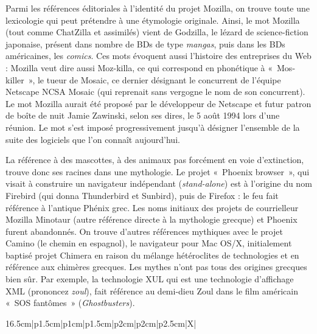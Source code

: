 \documentclass{FramateX}
\begin{document}
\begin{refsection}
Parmi les références éditoriales à l'identité du projet Mozilla, on
trouve toute une lexicologie qui peut prétendre à une étymologie
originale. Ainsi, le mot Mozilla (tout comme ChatZilla et assimilés)
vient de Godzilla, le lézard de science-fiction japonaise, présent dans
nombre de BDs de type \textit{mangas}, puis dans les BDs américaines, les
\textit{comics}. Ces mots évoquent aussi l'histoire des entreprises du
Web : Mozilla veut dire aussi Moz-killa, ce qui correspond en
phonétique à «~Mos-killer~», le tueur de Mosaic, ce dernier désignant
le concurrent de l'équipe Netscape NCSA Mosaic (qui reprenait sans
vergogne le nom de son concurrent). Le mot Mozilla aurait été proposé
par le développeur de Netscape et futur patron de boîte de nuit Jamie
Zawinski, selon ses dires, le 5 août 1994 lors d'une réunion. Le mot
s'est imposé progressivement jusqu'à désigner l'ensemble de la suite
des logiciels que l'on connaît aujourd'hui. 

La référence à des mascottes, à des animaux pas forcément en voie
d'extinction, trouve donc ses racines dans une mythologie. Le projet
«~Phoenix browser~», qui visait à construire un navigateur indépendant
(\textit{stand-alone}) est à l'origine du nom Firebird (qui donna
Thunderbird et Sunbird), puis de Firefox : le feu fait référence à
l'antique Phénix grec. Les noms initiaux des projets de courrielleur
Mozilla Minotaur (autre référence directe à la mythologie grecque) et
Phoenix furent abandonnés. On trouve d'autres références mythiques avec
le projet Camino (le chemin en espagnol), le navigateur pour Mac OS/X,
initialement baptisé projet Chimera en raison du mélange hétéroclites
de technologies et en référence aux chimères grecques. Les mythes n'ont
pas tous des origines grecques bien sûr. Par exemple, la technologie
XUL qui est une technologie d'affichage XML (prononcez \textit{zoul}),
fait référence au demi-dieu Zoul dans le film américain «~SOS
fantômes~» (\textit{Ghostbusters}). 



\begin{landscape}

\begin{table}
\centering
\begin{scriptsize}

\begin{tabularx}{16.5cm}{{|p{1.5cm}|p{1cm}|p{1.5cm}|p{2cm}|p{2cm}|p{2.5cm}|X|}}


\end{tabularx}
\end{scriptsize}
\end{table}
\end{landscape}
\end{refsection}
\end{document}
